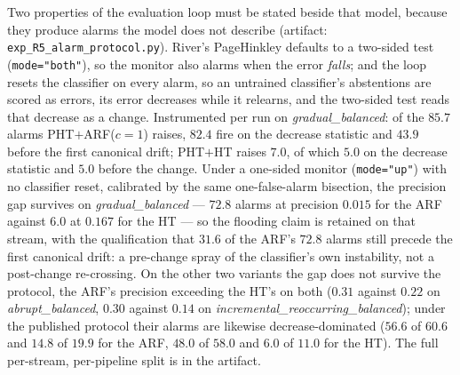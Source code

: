 \documentclass[smallextended]{svjour3}
\begin{document}
\begin{remark}
  Two properties of the evaluation loop must be stated beside that model, because they produce alarms the model does not describe (artifact: \texttt{exp\_R5\_alarm\_protocol.py}). River's PageHinkley defaults to a two-sided test (\texttt{mode="both"}), so the monitor also alarms when the error \emph{falls}; and the loop resets the classifier on every alarm, so an untrained classifier's abstentions are scored as errors, its error decreases while it relearns, and the two-sided test reads that decrease as a change. Instrumented per run on \emph{gradual\_balanced}: of the $85.7$ alarms PHT$+$ARF($c{=}1$) raises, $82.4$ fire on the decrease statistic and $43.9$ before the first canonical drift; PHT$+$HT raises $7.0$, of which $5.0$ on the decrease statistic and $5.0$ before the change. Under a one-sided monitor (\texttt{mode="up"}) with no classifier reset, calibrated by the same one-false-alarm bisection, the precision gap survives on \emph{gradual\_balanced} --- $72.8$ alarms at precision $0.015$ for the ARF against $6.0$ at $0.167$ for the HT --- so the flooding claim is retained on that stream, with the qualification that $31.6$ of the ARF's $72.8$ alarms still precede the first canonical drift: a pre-change spray of the classifier's own instability, not a post-change re-crossing. On the other two variants the gap does not survive the protocol, the ARF's precision exceeding the HT's on both ($0.31$ against $0.22$ on \emph{abrupt\_balanced}, $0.30$ against $0.14$ on \emph{incremental\_reoccurring\_balanced}); under the published protocol their alarms are likewise decrease-dominated ($56.6$ of $60.6$ and $14.8$ of $19.9$ for the ARF, $48.0$ of $58.0$ and $6.0$ of $11.0$ for the HT). The full per-stream, per-pipeline split is in the artifact.


\end{remark}
\end{document}
